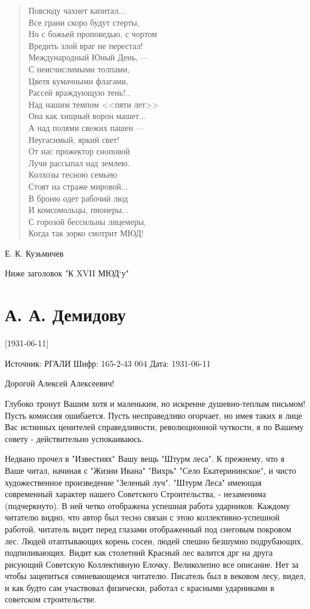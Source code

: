 \documentclass[]{memoir}
\begin{document}
\begin{verse}
Повсюду чахнет капитал...\\
Все грани скоро будут стерты,\\
Но с божьей проповедью, с чортом\\
Вредить злой враг не перестал!\\
Международный Юный День, ---\\
С неисчислимыми толпами,\\
Цветя кумачными флагами,\\
Рассей враждующую тень!..\\
Над нашим темпом <<пяти лет>>\\
Она как хищный ворон машет...\\
А над полями свежих пашен ---\\
Неугасимый, яркий свет!\\
От нас прожектор сноповой\\
Лучи рассыпал над землею.\\
Колхозы тесною семьею\\
Стоят на страже мировой...\\
В броню одет рабочий люд\\
И комсомольцы, пионеры...\\
С горозой бессильны лицемеры,\\
Когда так зорко смотрит МЮД!
\end{verse}

Е. К. Кузьмичев

Ниже заголовок
"К XVII МЮД`у"



\section{А. А. Демидову}

[1931-06-11]

Источник: РГАЛИ
Шифр: 165-2-43 004
Дата: 1931-06-11

Дорогой Алексей Алексеевич!

Глубоко тронут Вашим хотя и маленьким, но искренне душевно-теплым письмом! Пусть комиссия ошибается. Пусть несправедливо огорчает, но имея таких в лице Вас истинных ценителей справедливости, революционной чуткости, я по Вашему совету - действительно успокаиваюсь.

Недвано прочел в "Известиях" Вашу вещь "Штурм леса". К прежнему, что я Ваше читал, начиная с "Жизни Ивана" "Вихрь" "Село Екатерининское", и чисто художественное произведение "Зеленый луч". "Штурм Леса" имеющая современный характер нашего Советского Строительства, - незаменима (подчеркнуто). В ней четко отображена успешная работа ударников. Каждому читателю видно, что автор был тесно связан с этою коллективно-успешной работой, читатель видит перед глазами отображенный под снеговым покровом лес. Людей отаптывающих корень сосен, людей спешно безшумно подрубающих, подпиливающих. Видит как столетний Красный лес валится дрг на друга рисующий Советскую Коллективную Елочку. Великолепно все описание. Нет за чтобы зацепиться сомневающемся читателю. Писатель был в вековом лесу, видел, и как будто сам участвовал физически, работал с красными ударниками в советском строительстве.
\end{document}

